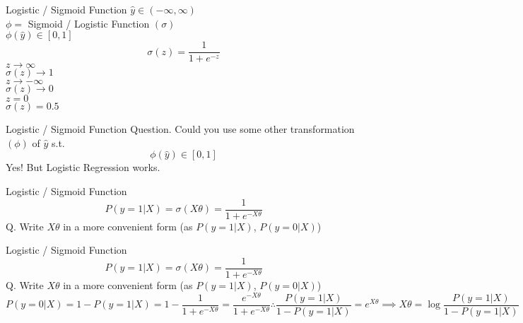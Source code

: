 \documentclass{beamer}
\begin{document}
	\begin{frame}{Logistic / Sigmoid Function}
	    $\hat{y} \in (-\infty, \infty)$ \\
	    $\phi =$ Sigmoid / Logistic Function $(\sigma)$ \\
	    $\phi(\hat{y}) \in [0, 1]$
	    \begin{equation*}
	        \sigma(z) = \frac{1}{1 + e^{-z}}
	    \end{equation*}
	    \hspace{8cm} $z \rightarrow \infty$\\
	    \hspace{8cm} $\sigma(z) \rightarrow 1$\\
	    \hspace{8cm} $z \rightarrow -\infty$\\
	    \hspace{8cm} $\sigma(z) \rightarrow 0$\\
	    \hspace{8cm} $z = 0$\\
	    \hspace{8cm} $\sigma(z) = 0.5$
	\end{frame}
	\begin{frame}{Logistic / Sigmoid Function}
	Question. Could you use some other transformation $(\phi)$ of $\hat{y}$ s.t. \\
	\begin{equation*}
	    \phi(\hat{y}) \in [0, 1]
	\end{equation*}
	Yes! But Logistic Regression works.
	\end{frame}
	\begin{frame}{Logistic / Sigmoid Function}
	    \begin{equation*}
	        P(y = 1 | X) = \sigma(X\theta) = \frac{1}{1 + e^{-X\theta}}    
	    \end{equation*}
	    Q. Write $X\theta$ in a more convenient form (as $P(y = 1|X)$, $P(y = 0 | X)$)\\
	\end{frame}
	\begin{frame}{Logistic / Sigmoid Function}
	    \begin{equation*}
	        P(y = 1 | X) = \sigma(X\theta) = \frac{1}{1 + e^{-X\theta}}    
	    \end{equation*}
	    Q. Write $X\theta$ in a more convenient form (as $P(y = 1|X)$, $P(y = 0 | X)$)\\
	    \begin{equation*}
	        P(y = 0 | X) = 1 - P(y = 1 | X) = 1 - \frac{1}{1 + e^{-X\theta}} = \frac{e^{-X\theta}}{1 + e^{-X\theta}} 
	        \therefore \frac{P(y = 1|X)}{1 - P(y = 1|X)} = e^{X\theta}
	        \implies X\theta = \log\frac{P(y = 1|X)}{1 - P(y = 1 | X)}
	    \end{equation*}
	\end{frame}
\end{document}
